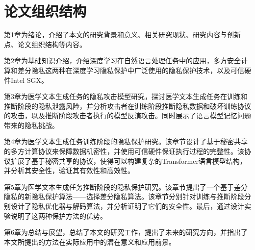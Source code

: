 \section{论文组织结构}

第1章为绪论，介绍了本文的研究背景和意义、相关研究现状、研究内容与创新点、论文组织结构等内容。

第2章为基础知识介绍，介绍深度学习在自然语言处理任务中的应用，多方安全计算和差分隐私这两种在深度学习隐私保护中广泛使用的隐私保护技术，以及可信硬件Intel SGX。

第3章为医学文本生成任务的隐私攻击模型研究，探讨医学文本生成任务在训练和推断阶段的隐私泄露风险，并分析攻击者在训练阶段推断隐私数据和破坏训练协议的攻击，以及推断阶段攻击者执行的模型反演攻击。同时展示了语言模型记忆问题带来的隐私挑战。

第4章为医学文本生成任务训练阶段的隐私保护研究。该章节设计了基于秘密共享的多方计算协议来保障数据机密性，并使用可信硬件保证执行过程的完整性。该协议扩展了基于秘密共享的协议，使得可以构建复杂的Transformer语言模型结构，并分析其安全性，验证其有效性和高效性。

第5章为医学文本生成任务推断阶段的隐私保护研究。该章节提出了一个基于差分隐私的新隐私保护算法——选择差分隐私算法。该章节分别针对训练与推断阶段分别设计了隐私优化器与解码算法，并分析证明了它们的安全性。最后，通过设计实验说明了这两种保护方法的优势。

第6章为总结与展望，总结了本文的研究工作，提出了未来的研究方向，并指出了本文所提出的方法在实际应用中的潜在意义和应用前景。